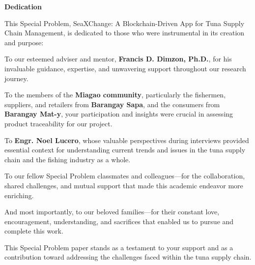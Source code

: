 \begin{center}
	\textbf{Dedication}
\end{center}

This Special Problem, SeaXChange: A Blockchain-Driven App for Tuna Supply Chain Management, is dedicated to those who were instrumental in its creation and purpose:

To our esteemed adviser and mentor, \textbf{Francis D. Dimzon, Ph.D.}, for his invaluable guidance, expertise, and unwavering support throughout our research journey.

To the members of the \textbf{Miagao community}, particularly the fishermen, suppliers, and retailers from \textbf{Barangay Sapa}, and the consumers from \textbf{Barangay Mat-y}, your participation and insights were crucial in assessing product traceability for our project.

To \textbf{Engr. Noel Lucero}, whose valuable perspectives during interviews provided essential context for understanding current trends and issues in the tuna supply chain and the fishing industry as a whole.

To our fellow Special Problem classmates and colleagues—for the collaboration, shared challenges, and mutual support that made this academic endeavor more enriching.

And most importantly, to our beloved families—for their constant love, encouragement, understanding, and sacrifices that enabled us to pursue and complete this work.

This Special Problem paper stands as a testament to your support and as a contribution toward addressing the challenges faced within the tuna supply chain.
